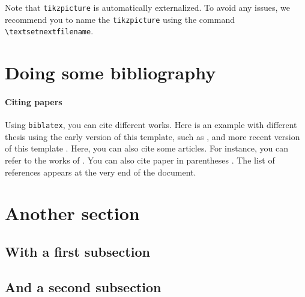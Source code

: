 \begin{remark}
    Note that \texttt{tikzpicture} is automatically externalized.
    To avoid any issues, we recommend you to name the \texttt{tikzpicture} using the command \texttt{\textbackslash textsetnextfilename}.
\end{remark}






\section{Doing some bibliography}%
\label{sec:doing_some_bibliography}

\paragraph{Citing papers}%
\label{par:Citing papers}
Using \texttt{biblatex}, you can cite different works.
Here is an example with different thesis using the early version of this template, such as \textcite{cherriere_elaboration_2023,caruel_caracterisation_2023,ruda_methode_2023,abdel_hafiz_etude_2023}, and more recent version of this template \parencite{daby-seesaram_towards_2023,loiseau_formulation_2023}.
Here, you can also cite some articles.
For instance, you can refer to the works of \textcite{wurtzer_premiere_2022,ribeiro_nogueira_differential_2024}.
You can also cite paper in parentheses \parencite{ruda_first_2022,daby-seesaram_hybrid_2023}.
The list of references appears at the very end of the document.

\section{Another section}%
\label{sec:Another section}

\subsection{With a first subsection}%
\label{sub:with_a_first_subsection}

\lipsum[2-4]

\subsection{And a second subsection}%
\label{sub:and_a_second_subsection}

\lipsum[2-4]

